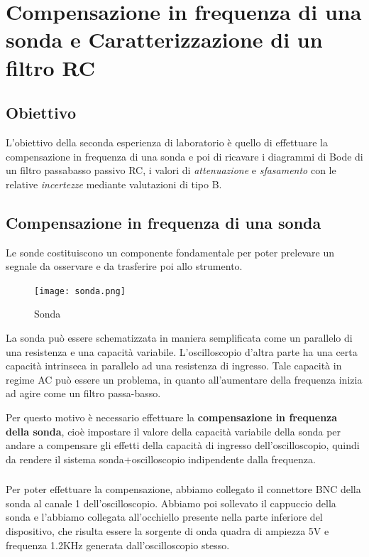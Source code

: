 \chapter{Compensazione in frequenza di una sonda  e Caratterizzazione di un filtro RC}
\label{chap:seconda_prova}

\section*{Obiettivo}
\label{sec:ob_second}
L'obiettivo della seconda esperienza di laboratorio è quello di effettuare la compensazione in frequenza di una sonda e poi di ricavare i diagrammi di Bode di un filtro passabasso passivo RC, i valori di \emph{attenuazione} e \emph{sfasamento} con le relative \emph{incertezze} mediante valutazioni di tipo B.

\section{Compensazione in frequenza di una sonda}
Le sonde costituiscono un componente fondamentale per poter prelevare un segnale da osservare e da trasferire poi allo strumento.

\begin{figure}[h]
    \centering
    \texttt{[image: sonda.png]}
    \caption{Sonda}
    \label{fig:sonda}
\end{figure}

La sonda può essere schematizzata in maniera semplificata come un parallelo di una resistenza e una capacità variabile. L'oscilloscopio d'altra parte ha una certa capacità intrinseca in parallelo ad una resistenza di ingresso. Tale capacità in regime AC può essere un problema, in quanto all'aumentare della frequenza inizia ad agire come un filtro passa-basso.

Per questo motivo è necessario effettuare la \textbf{compensazione in frequenza della sonda}, cioè impostare il valore della capacità variabile della sonda per andare a compensare gli effetti della capacità di ingresso dell'oscilloscopio, quindi da rendere il sistema sonda+oscilloscopio indipendente dalla frequenza.

\subsection*{}
Per poter effettuare la compensazione, abbiamo collegato il connettore BNC della sonda al canale 1 dell'oscilloscopio. Abbiamo poi sollevato il cappuccio della sonda e l'abbiamo collegata all'occhiello presente nella parte inferiore del dispositivo, che risulta essere la sorgente di onda quadra di ampiezza 5V e frequenza 1.2KHz generata dall'oscilloscopio stesso.

